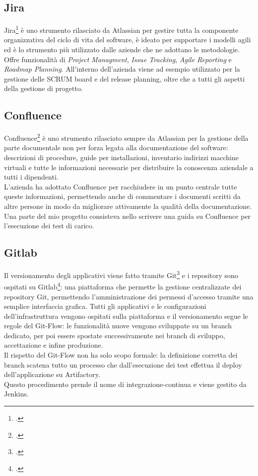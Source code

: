 \subsection{Jira}
Jira\footcite{site:jira} è uno strumento rilasciato da Atlassian per gestire tutta la componente organizzativa del ciclo di vita del software, è ideato per supportare i modelli agili ed è lo strumento più utilizzato dalle aziende che ne adottano le metodologie. \\
Offre funzionalità di \textit{Project Managment}, \textit{Issue Tracking}, \textit{Agile Reporting} e \textit{Roadmap Planning}.
All'interno dell'azienda viene ad esempio utilizzato per la gestione delle SCRUM board e del release planning, oltre che a tutti gli aspetti della gestione di progetto.
\subsection{Confluence}
Confluence\footcite{site:confluence} è uno strumento rilasciato sempre da Atlassian per la gestione della parte documentale non per forza legata alla documentazione del software: descrizioni di procedure, guide per installazioni, inventario indirizzi macchine virtuali e tutte le informazioni necessarie per distribuire la conoscenza aziendale a tutti i dipendenti. \\
L'azienda ha adottato Confluence per racchiudere in un punto centrale tutte queste informazioni, permettendo anche di commentare i documenti scritti da altre persone in modo da migliorare attivamente la qualità della documentazione. \\
Una parte del mio progetto consisteva nello scrivere una guida su Confluence per l'esecuzione dei test di carico.
\subsection{Gitlab}
Il versionamento degli applicativi viene fatto tramite Git\footcite{site:git} e i repository sono ospitati su Gitlab\footcite{site:gitlab}: una piattaforma che permette la gestione centralizzate dei repository Git, permettendo l'amministrazione dei permessi d'accesso tramite una semplice interfaccia grafica.
Tutti gli applicativi e le configurazioni dell'infrastruttura vengono ospitati sulla piattaforma e il versionamento segue le regole del Git-Flow: le funzionalità nuove vengono sviluppate su un branch dedicato, per poi essere spostate successivamente nei \gls{branch} di sviluppo, accettazione e infine produzione. \\
Il rispetto del Git-Flow non ha solo scopo formale: la definizione corretta dei branch scatena tutto un processo che dall'esecuzione dei test effettua il \gls{deploy} dell'applicazione su Artifactory. \\
Questo procedimento prende il nome di \gls{integrazione-continua} e viene gestito da Jenkins.
